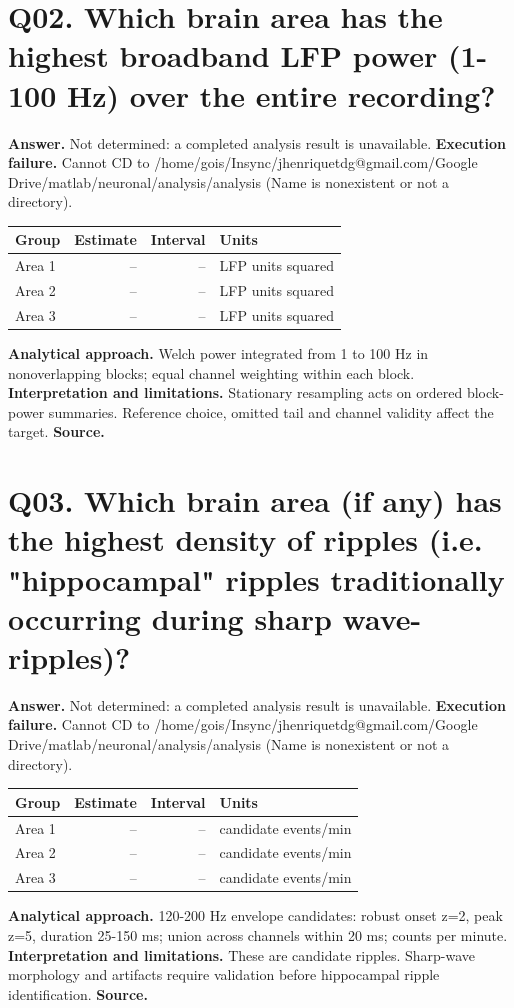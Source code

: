 \documentclass[11pt,a4paper]{article}
\begin{document}
\section*{Q02. Which brain area has the highest broadband LFP power (1-100 Hz) over the entire recording?}
\textbf{Answer.} Not determined: a completed analysis result is unavailable.
\textbf{Execution failure.} Cannot CD to /home/gois/Insync/jhenriquetdg@gmail.com/Google Drive/matlab/neuronal/analysis/analysis (Name is nonexistent or not a directory).
\begin{tabularx}{\linewidth}{XrrX}\toprule Group & Estimate & Interval & Units \\\midrule
Area 1 & -- & -- & LFP units squared \\
Area 2 & -- & -- & LFP units squared \\
Area 3 & -- & -- & LFP units squared \\
\bottomrule\end{tabularx}
\textbf{Analytical approach.} Welch power integrated from 1 to 100 Hz in nonoverlapping blocks; equal channel weighting within each block.
\textbf{Interpretation and limitations.} Stationary resampling acts on ordered block-power summaries. Reference choice, omitted tail and channel validity affect the target.
\textbf{Source.} 
\clearpage
\section*{Q03. Which brain area (if any) has the highest density of ripples (i.e. "hippocampal" ripples traditionally occurring during sharp wave-ripples)?}
\textbf{Answer.} Not determined: a completed analysis result is unavailable.
\textbf{Execution failure.} Cannot CD to /home/gois/Insync/jhenriquetdg@gmail.com/Google Drive/matlab/neuronal/analysis/analysis (Name is nonexistent or not a directory).
\begin{tabularx}{\linewidth}{XrrX}\toprule Group & Estimate & Interval & Units \\\midrule
Area 1 & -- & -- & candidate events/min \\
Area 2 & -- & -- & candidate events/min \\
Area 3 & -- & -- & candidate events/min \\
\bottomrule\end{tabularx}
\textbf{Analytical approach.} 120-200 Hz envelope candidates: robust onset z=2, peak z=5, duration 25-150 ms; union across channels within 20 ms; counts per minute.
\textbf{Interpretation and limitations.} These are candidate ripples. Sharp-wave morphology and artifacts require validation before hippocampal ripple identification.
\textbf{Source.} 
\clearpage
\end{document}

